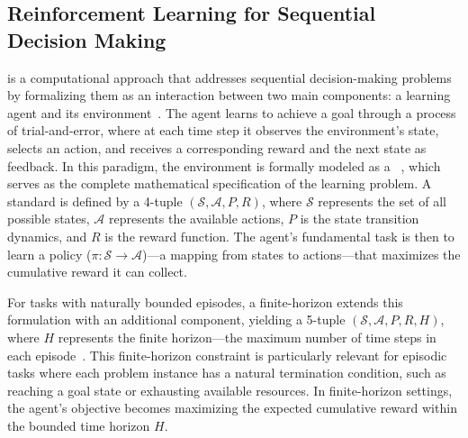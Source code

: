 \subsection{Reinforcement Learning for Sequential Decision Making}
\RL{} is a computational approach that addresses sequential decision-making problems by formalizing them as an interaction between two main components: a learning agent and its environment~\cite{sutton2018reinforcement}. The agent learns to achieve a goal through a process of trial-and-error, where at each time step it observes the environment's state, selects an action, and receives a corresponding reward and the next state as feedback. In this paradigm, the environment is formally modeled as a \MDP{}~\cite{puterman2014markov}, which serves as the complete mathematical specification of the learning problem. 
A standard \MDP{} is defined by a 4-tuple $(\mathcal{S}, \mathcal{A}, P, R)$, where $\mathcal{S}$ represents the set of all possible states, $\mathcal{A}$ represents the available actions, $P$ is the state transition dynamics, and $R$ is the reward function. The agent's fundamental task is then to learn a policy ($\pi: \mathcal{S} \rightarrow \mathcal{A}$)---a mapping from states to actions---that maximizes the cumulative reward it can collect.

For tasks with naturally bounded episodes, a finite-horizon \MDP{} extends this formulation with an additional component, yielding a 5-tuple $(\mathcal{S}, \mathcal{A}, P, R, H)$, where $H$ represents the finite horizon---the maximum number of time steps in each episode~\cite{sutton2018reinforcement}. This finite-horizon constraint is particularly relevant for episodic tasks where each problem instance has a natural termination condition, such as reaching a goal state or exhausting available resources. In finite-horizon settings, the agent's objective becomes maximizing the expected cumulative reward within the bounded time horizon $H$.


